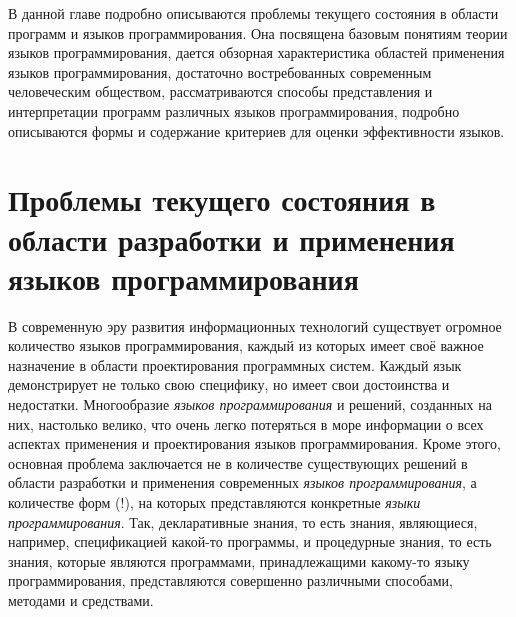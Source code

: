В данной главе подробно описываются проблемы текущего состояния в области программ и языков программирования. Она посвящена базовым понятиям теории языков программирования, дается обзорная характеристика областей применения языков программирования, достаточно востребованных современным человеческим обществом, рассматриваются способы представления и интерпретации программ различных языков программирования, подробно описываются формы и содержание критериев для оценки эффективности языков.

\section{Проблемы текущего состояния в области разработки и применения языков программирования}
\label{sec_programs_problems_and_tasks}

В современную эру развития информационных технологий существует огромное количество языков программирования, каждый из которых имеет своё важное назначение в области проектирования программных систем. Каждый язык демонстрирует не только свою специфику, но имеет свои достоинства и недостатки. Многообразие \textit{языков программирования} \cite{Sebesta2012} и решений, созданных на них, настолько велико, что очень легко потеряться в море информации о всех аспектах применения и проектирования языков программирования. Кроме этого, основная проблема заключается не в количестве существующих решений в области разработки и применения современных \textit{языков программирования}, а количестве форм (!), на которых представляются конкретные \textit{языки программирования}. Так, декларативные знания, то есть знания, являющиеся, например, спецификацией какой-то программы, и процедурные знания, то есть знания, которые являются программами, принадлежащими какому-то языку программирования, представляются совершенно различными способами, методами и средствами.

